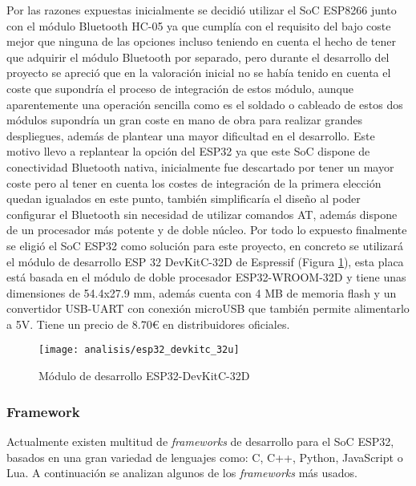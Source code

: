 \documentclass[../proyecto.tex]{subfiles}
\begin{document}
Por las razones expuestas inicialmente se decidió utilizar el SoC ESP8266 junto con el módulo Bluetooth HC-05 ya que cumplía con el requisito del bajo coste mejor que ninguna de las opciones incluso teniendo en cuenta el hecho de tener que adquirir el módulo Bluetooth por separado, pero durante el desarrollo del proyecto se apreció que en la valoración inicial no se había tenido en cuenta el coste que supondría el proceso de integración de estos módulo, aunque aparentemente una operación sencilla como es el soldado o cableado de estos dos módulos supondría un gran coste en mano de obra para realizar grandes despliegues, además de plantear una mayor dificultad en el desarrollo. Este motivo llevo a replantear la opción del ESP32 ya que este SoC dispone de conectividad Bluetooth nativa, inicialmente fue descartado por tener un mayor coste pero al tener en cuenta los costes de integración de la primera elección quedan igualados en este punto, también simplificaría el diseño al poder configurar el Bluetooth sin necesidad de utilizar comandos AT, además dispone de un procesador más potente y de doble núcleo. Por todo lo expuesto finalmente se eligió el SoC ESP32 como solución para este proyecto, en concreto se utilizará el módulo de desarrollo ESP 32 DevKitC-32D de Espressif (Figura \ref{fig:esp32_devkitc_32d}), esta placa está basada en el módulo de doble procesador ESP32-WROOM-32D y tiene unas dimensiones de 54.4x27.9 mm, además cuenta con 4 MB de memoria flash y un convertidor USB-UART con conexión microUSB que también permite alimentarlo a 5V. Tiene un precio de 8.70€ en distribuidores oficiales.\\

\begin{figure}[H]
\centering
\texttt{[image: analisis/esp32\_devkitc\_32u]}
\caption{Módulo de desarrollo ESP32-DevKitC-32D}
\label{fig:esp32_devkitc_32d}
\end{figure}

\subsubsection{Framework}

Actualmente existen multitud de \textit{frameworks} de desarrollo para el SoC ESP32, basados en una gran variedad de lenguajes como: C, C++, Python, JavaScript o Lua. A continuación se analizan algunos de los  \textit{frameworks} más usados.\\
\end{document}
